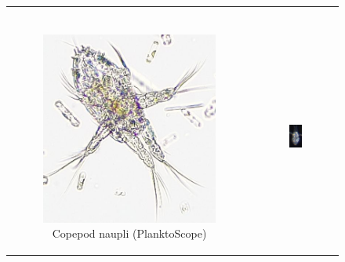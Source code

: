 \begin{figure}[t]
\begin{tabular}{cc}
\begin{subfigure}[b]{0.49\linewidth}
        \end{subfigure} \\
        \begin{subfigure}[b]{0.49\linewidth}
            \centering
            \includegraphics[width=\linewidth]{latex/figures/10_14_13_237354_14.jpg}
            \caption{Copepod naupli (PlanktoScope)}
            \label{fig:naupli-ps}
        \end{subfigure} &
        \begin{subfigure}[b]{0.49\linewidth}
            \centering
            \includegraphics[height=\linewidth, angle=90,origin=c]{latex/figures/20230925_115158.468.0.png}

\end{subfigure}
\end{tabular}
\end{figure}
